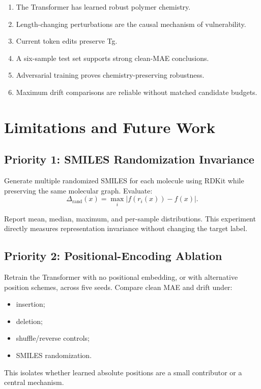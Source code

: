 \documentclass[11pt]{article}
\begin{document}
\begin{enumerate}
  \item The Transformer has learned robust polymer chemistry.
  \item Length-changing perturbations are the causal mechanism of vulnerability.
  \item Current token edits preserve Tg.
  \item A six-sample test set supports strong clean-MAE conclusions.
  \item Adversarial training proves chemistry-preserving robustness.
  \item Maximum drift comparisons are reliable without matched candidate budgets.
\end{enumerate}

\section{Limitations and Future Work}

\subsection{Priority 1: SMILES Randomization Invariance}

Generate multiple randomized SMILES for each molecule using RDKit while
preserving the same molecular graph. Evaluate:
\[
\Delta_{\text{rand}}(x) = \max_i |f(r_i(x)) - f(x)|.
\]

Report mean, median, maximum, and per-sample distributions. This experiment
directly measures representation invariance without changing the target label.

\subsection{Priority 2: Positional-Encoding Ablation}

Retrain the Transformer with no positional embedding, or with alternative
position schemes, across five seeds. Compare clean MAE and drift under:
\begin{itemize}
  \item insertion;
  \item deletion;
  \item shuffle/reverse controls;
  \item SMILES randomization.
\end{itemize}

This isolates whether learned absolute positions are a small contributor or a
central mechanism.
\end{document}
